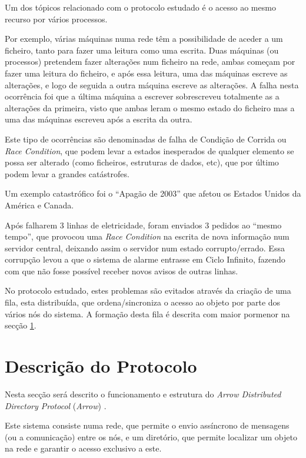 Um dos tópicos relacionado com o protocolo estudado é o acesso ao mesmo recurso por vários processos.

Por exemplo, várias máquinas numa rede têm a possibilidade de aceder a um ficheiro, tanto para fazer uma leitura como uma escrita.
Duas máquinas (ou processos) pretendem fazer alterações num ficheiro na rede, ambas começam por fazer uma leitura do ficheiro, e após essa leitura, uma das máquinas escreve as alterações, e logo de seguida a outra máquina escreve as alterações. A falha nesta ocorrência foi que a última máquina a escrever sobrescreveu totalmente as a alterações da primeira, visto que ambas leram o mesmo estado do ficheiro mas a uma das máquinas escreveu após a escrita da outra.

Este tipo de ocorrências são denominadas de falha de Condição de Corrida ou \emph{Race Condition}, que podem levar a estados inesperados de qualquer elemento se possa ser alterado (como ficheiros, estruturas de dados, etc), 
que por último podem levar a grandes catástrofes.

Um exemplo catastrófico foi o ``Apagão de 2003'' \cite{blackout} que afetou os Estados Unidos da América e Canada. 

Após falharem 3 linhas de eletricidade, foram enviados 3 pedidos ao ``mesmo tempo'', que provocou uma \emph{Race Condition} na escrita de nova informação num servidor central, deixando assim o servidor num estado corrupto/errado.
Essa corrupção levou a que o sistema de alarme entrasse em Ciclo Infinito, fazendo com que não fosse possível receber novos avisos de outras linhas.

No protocolo estudado, estes problemas são evitados através da criação de uma fila, esta distribuída, que ordena/sincroniza o acesso ao objeto por parte dos vários nós do sistema.
A formação desta fila é descrita com maior pormenor na secção \ref{motivacao:sec:descricao_protocolo}. 

\section{Descrição do Protocolo}
\label{motivacao:sec:descricao_protocolo}

Nesta secção será descrito o funcionamento e estrutura do \textit{Arrow Distributed Directory Protocol} (\emph{Arrow}) \cite{Arrow}. 

Este sistema consiste numa rede, que permite o envio assíncrono de mensagens (ou a comunicação) entre os nós, e um diretório, que permite localizar um objeto na rede e garantir o acesso exclusivo a este. 

